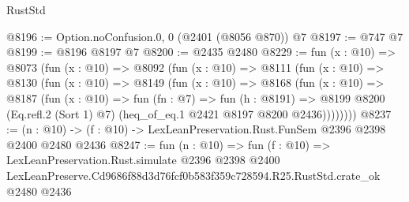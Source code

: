 \begin{lexlean}{RustStd}
\begin{coremodule}
@8196 := Option.noConfusion.{0, 0} (@2401 (@8056 @870)) @7
@8197 := @747 @7
@8199 := @8196 @8197 @7
@8200 := @2435 @2480
@8229 := fun (x : @10) =>
  @8073
    (fun (x : @10) =>
    @8092
      (fun (x : @10) =>
      @8111
        (fun (x : @10) =>
        @8130
          (fun (x : @10) =>
          @8149
            (fun (x : @10) =>
            @8168
              (fun (x : @10) =>
              @8187
                (fun (x : @10) =>
                fun (fn : @7) =>
                fun (h : @8191) =>
                @8199 @8200 (Eq.refl.{2} (Sort 1) @7) (heq_of_eq.{1} @2421 @8197 @8200 @2436))))))))
@8237 := (n : @10) -> (f : @10) -> LexLeanPreservation.Rust.FunSem @2396 @2398 @2400 @2480 @2436
@8247 := fun (n : @10) =>
  fun (f : @10) =>
  LexLeanPreservation.Rust.simulate
    @2396
    @2398
    @2400
    LexLeanPreserve.Cd9686f88d3d76fcf0b583f359c728594.R25.RustStd.crate_ok
    @2480
    @2436
\end{coremodule}
\end{lexlean}
